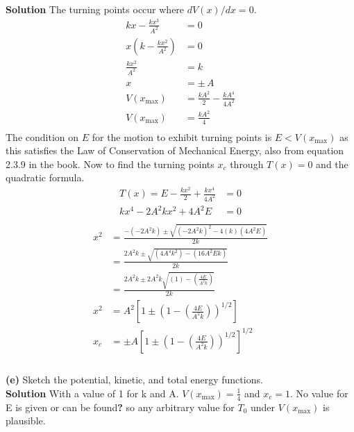 \documentclass[]{article}
\newcommand{\bd}{\textbf}
\begin{document}
\bd{Solution} The turning points occur where $ dV(x)/dx = 0$.
\begin{equation}
	\begin{split}
		kx - \frac{kx^3}{A^2} &= 0 \\
		x\left(k - \frac{kx^2}{A^2} \right) &= 0 \\
		\frac{kx^2}{A^2} &= k \\
		x &= \pm \, A \\
		V(x_\text{max}) &= \frac{kA^2}{2} - \frac{kA^4}{4A^2} \\
		V(x_\text{max}) &= \frac{kA^2}{4} \\
	\end{split}
\end{equation}
The condition on $ E $ for the motion to exhibit turning points is $ E < V(x_\text{max}) $ as this satisfies the Law of Conservation of Mechanical Energy, also from equation 2.3.9 in the book. Now to find the turning points $ x_c $ through $ T(x) = 0 $ and the quadratic formula.
\begin{equation}
	\begin{split}
		T(x) = E - \frac{kx^2}{2} + \frac{kx^4}{4A^2} &= 0 \\
		kx^4 -2A^2kx^2 + 4A^2E &= 0 \\
	\end{split}
\end{equation}
\begin{equation}
	\begin{split}
		x^2 &= \frac{-(-2A^2k) \pm \sqrt{(-2A^2k)^2 - 4(k)(4A^2E)}}{2k} \\
		&= \frac{2A^2k \pm \sqrt{(4A^4k^2) - (16A^2Ek)}}{2k} \\
		&= \frac{2A^2k \pm 2A^2k\sqrt{(1) - (\frac{4E}{A^2k})}}{2k} \\
		x^2 &= A^2 \left[ 1 \pm \left(1 - \left( \frac{4E}{A^2k} \right) \right)^\text{1/2} \right] \\
		x_c &= \pm A \left[ 1 \pm \left(1 - \left( \frac{4E}{A^2k} \right) \right)^\text{1/2} \right]^\text{1/2} \\
	\end{split}
\end{equation}
\\
\clearpage
\bd{(e)} Sketch the potential, kinetic, and total energy functions. \\

\bd{Solution} With a value of 1 for k and A. $ V(x_\text{max}) = \frac{1}{4} $ and $ x_c = 1 $. No value for E is given or can be found\bd{?} so any arbitrary value for $ T_0 $ under $ V(x_\text{max}) $ is plausible. \\
\end{document}
